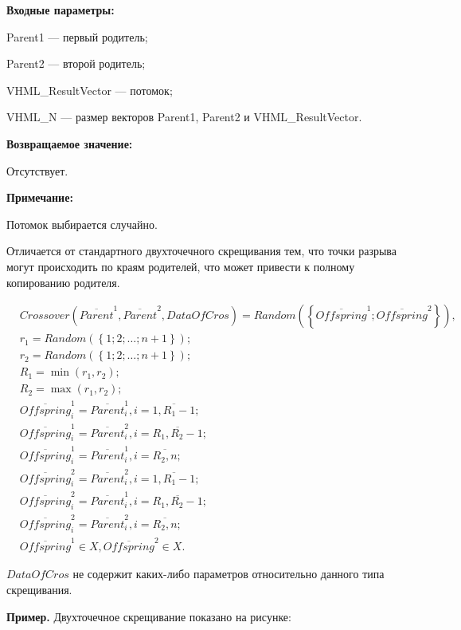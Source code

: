 \textbf{Входные параметры:}
 
 Parent1 --- первый родитель;
 
 Parent2 --- второй родитель;
 
 VHML\_ResultVector --- потомок;
 
 VHML\_N --- размер векторов Parent1, Parent2 и VHML\_ResultVector.

\textbf{Возвращаемое значение:}

 Отсутствует.
 
\textbf{ Примечание:}

 Потомок выбирается случайно.
 
 Отличается от стандартного двухточечного скрещивания тем, что точки разрыва могут происходить по краям родителей, что может привести к полному копированию родителя.
 
\begin{align}
&Crossover \left( \overline{Parent}^1, \overline{Parent}^2, DataOfCros\right)=Random \left(\left\lbrace \overline{Offspring}^1; \overline{Offspring}^2\right\rbrace  \right),\nonumber \\
&r_1=Random\left( \left\lbrace 1; 2; \ldots; n+1\right\rbrace \right); \nonumber \\
&r_2=Random\left( \left\lbrace 1; 2; \ldots; n+1\right\rbrace \right); \nonumber \\
&R_1=\min \left( r_1, r_2\right) ; \nonumber \\
&R_2=\max \left( r_1, r_2\right) ; \nonumber \\
& \overline{Offspring}^1_i=\overline{Parent}^1_i, i=\overline{1,R_1-1};\nonumber\\
& \overline{Offspring}^1_i=\overline{Parent}^2_i, i=\overline{R_1,R_2-1};\nonumber\\
&  \overline{Offspring}^1_i=\overline{Parent}^1_i, i=\overline{R_2,n};\nonumber\\
& \overline{Offspring}^2_i=\overline{Parent}^2_i, i=\overline{1,R_1-1};\nonumber\\
& \overline{Offspring}^2_i=\overline{Parent}^1_i, i=\overline{R_1,R_2-1};\nonumber\\
&  \overline{Offspring}^2_i=\overline{Parent}^2_i, i=\overline{R_2,n};\nonumber\\
&\overline{Offspring}^1\in X, \overline{Offspring}^2\in X.
\end{align}

$ DataOfCros $ не содержит каких-либо параметров относительно данного типа скрещивания.

\textbf{Пример.} Двухточечное скрещивание показано на рисунке:


